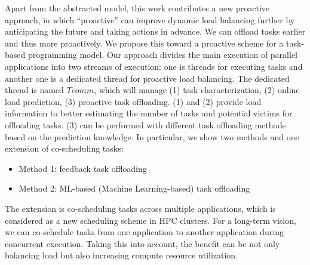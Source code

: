 Apart from the abstracted model, this work contributes a new proactive approach, in which ``proactive'' can improve dynamic load balancing further by anticipating the future and taking actions in advance. We can offload tasks earlier and thus more proactively. We propose this toward a proactive scheme for a task-based programming model. Our approach divides the main execution of parallel applications into two streams of execution: one is threads for executing tasks and another one is a dedicated thread for proactive load balancing. The dedicated thread is named $Tcomm$, which will manage (1) task characterization, (2) online load prediction, (3) proactive task offloading. (1) and (2) provide load information to better estimating the number of tasks and potential victims for offloading tasks. (3) can be performed with different task offloading methods based on the prediction knowledge. In particular, we show two methods and one extension of co-scheduling tasks:
\begin{itemize}
	\item Method 1: feedback task offloading
	\item Method 2: ML-based (Machine Learning-based) task offloading
\end{itemize}

The extension is co-scheduling tasks across multiple applications, which is considered as a new scheduling scheme in HPC clusters. For a long-term vision, we can co-schedule tasks from one application to another application during concurrent execution. Taking this into account, the benefit can be not only balancing load but also increasing compute resource utilization.

